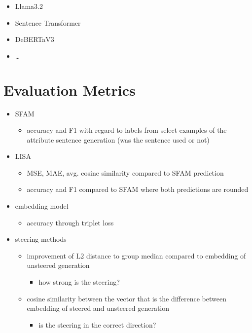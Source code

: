 \begin{itemize}
  \item Llama3.2
  \item Sentence Transformer
  \item DeBERTaV3
  \item \ldots
\end{itemize}


\section{Evaluation Metrics}
\label{sec:approach:evaluationMetrics}

\begin{itemize}
  \item SFAM
        \begin{itemize}
          \item accuracy and F1 with regard to labels from select examples of the attribute sentence generation (was the sentence used or not)
        \end{itemize}
  \item LISA
        \begin{itemize}
          \item MSE, MAE, avg. cosine similarity compared to SFAM prediction
          \item accuracy and F1 compared to SFAM where both predictions are rounded
        \end{itemize}
  \item embedding model
        \begin{itemize}
          \item accuracy through triplet loss
        \end{itemize}
  \item steering methods
        \begin{itemize}
          \item improvement of L2 distance to group median compared to embedding of unsteered generation
                \begin{itemize}
                  \item how strong is the steering?
                \end{itemize}
          \item cosine similarity between the vector that is the difference between embedding of steered and unsteered generation
                \begin{itemize}
                  \item is the steering in the correct direction?
                \end{itemize}
        \end{itemize}
\end{itemize}


